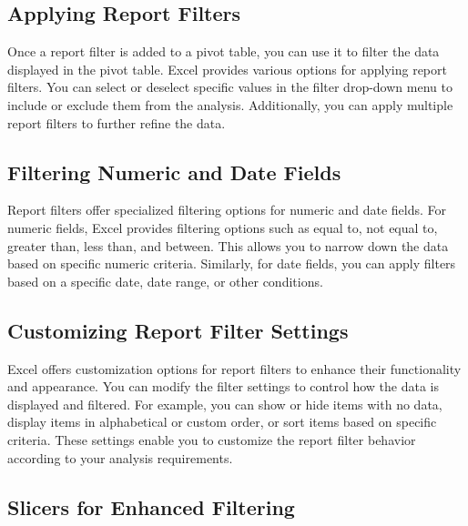 \documentclass[
]{book}
\begin{document}
\hypertarget{applying-report-filters}{%
\subsection{Applying Report Filters}\label{applying-report-filters}}

Once a report filter is added to a pivot table, you can use it to filter the data displayed in the pivot table. Excel provides various options for applying report filters. You can select or deselect specific values in the filter drop-down menu to include or exclude them from the analysis. Additionally, you can apply multiple report filters to further refine the data.

\hypertarget{filtering-numeric-and-date-fields}{%
\subsection{Filtering Numeric and Date Fields}\label{filtering-numeric-and-date-fields}}

Report filters offer specialized filtering options for numeric and date fields. For numeric fields, Excel provides filtering options such as equal to, not equal to, greater than, less than, and between. This allows you to narrow down the data based on specific numeric criteria. Similarly, for date fields, you can apply filters based on a specific date, date range, or other conditions.

\hypertarget{customizing-report-filter-settings}{%
\subsection{Customizing Report Filter Settings}\label{customizing-report-filter-settings}}

Excel offers customization options for report filters to enhance their functionality and appearance. You can modify the filter settings to control how the data is displayed and filtered. For example, you can show or hide items with no data, display items in alphabetical or custom order, or sort items based on specific criteria. These settings enable you to customize the report filter behavior according to your analysis requirements.

\hypertarget{slicers-for-enhanced-filtering}{%
\subsection{Slicers for Enhanced Filtering}\label{slicers-for-enhanced-filtering}}
\end{document}
